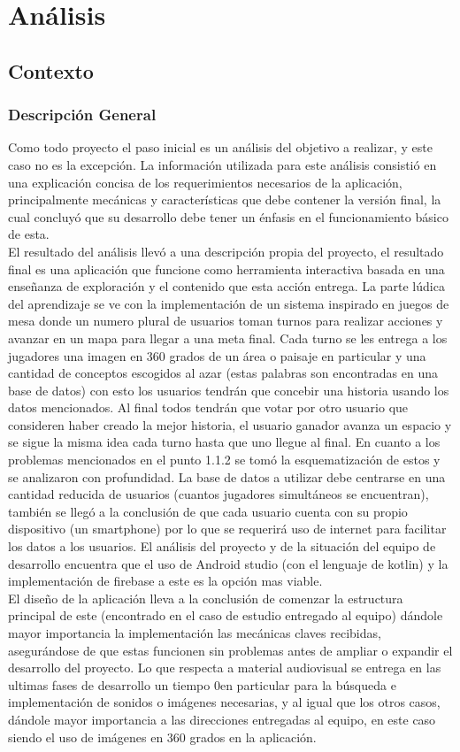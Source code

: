 \section{Análisis}

\subsection{Contexto}
\subsubsection{Descripción General}
Como todo proyecto el paso inicial es un análisis del objetivo a realizar, y este caso no es la excepción. La información utilizada para este análisis consistió en una explicación concisa de los requerimientos necesarios de la aplicación, principalmente mecánicas y características que debe contener la versión final, la cual concluyó que su desarrollo debe tener un énfasis en el funcionamiento básico de esta.\\
El resultado del análisis llevó a una descripción propia del proyecto, el resultado final es una aplicación que funcione como herramienta interactiva basada en una enseñanza de exploración y el contenido que esta acción entrega. La parte lúdica del aprendizaje se ve con la implementación de un sistema inspirado en juegos de mesa donde un numero plural de usuarios toman turnos para realizar acciones y avanzar en un mapa para llegar a una meta final. Cada turno se les entrega a los jugadores una imagen en 360 grados de un área o paisaje en particular y una cantidad de conceptos escogidos al azar (estas palabras son encontradas en una base de datos) con esto los usuarios tendrán que concebir una historia usando los datos mencionados. Al final todos tendrán que votar por otro usuario que consideren haber creado la mejor historia, el usuario ganador avanza un espacio y se sigue la misma idea cada turno hasta que uno llegue al final.
En cuanto a los problemas mencionados en el punto 1.1.2 se tomó la esquematización de estos y se analizaron con profundidad. La base de datos a utilizar debe centrarse en una cantidad reducida de usuarios (cuantos jugadores simultáneos se encuentran), también se llegó a la conclusión de que cada usuario cuenta con su propio dispositivo (un smartphone) por lo que se requerirá uso de internet para facilitar los datos a los usuarios. El análisis del proyecto y de la situación del equipo de desarrollo encuentra que el uso de Android studio (con el lenguaje de kotlin) y la implementación de firebase a este es la opción mas viable.\\
El diseño de la aplicación lleva a la conclusión de comenzar la estructura principal de este (encontrado en el caso de estudio entregado al equipo) dándole mayor importancia la implementación las mecánicas claves recibidas, asegurándose de que estas funcionen sin problemas antes de ampliar o expandir el desarrollo del proyecto.
Lo que respecta a material audiovisual se entrega en las ultimas fases de desarrollo un tiempo 0en particular para la búsqueda e implementación de sonidos o imágenes necesarias, y al igual que los otros casos, dándole mayor importancia a las direcciones entregadas al equipo, en este caso siendo el uso de imágenes en 360 grados en la aplicación.

